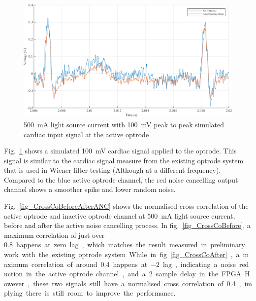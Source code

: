 \begin{landscape}\centering
\begin{figure}[h]
\centerline{\includegraphics[width=\linewidth]{5-Experiment/SimCardiac.pdf}}
\caption{\qty{500}{\mA} light source current with \qty{100}{\mV} peak to peak simulated cardiac input signal at the active optrode}
\label{fig_SimCardiac}
\end{figure}
\end{landscape}

Fig.~\ref{fig_SimCardiac} shows a simulated \qty{100}{mV} cardiac signal applied to the optrode.  This signal is similar to the cardiac signal measure from the existing optrode system that is used in Wiener filter testing (Although at a different frequency).  Compared to the blue active optrode channel, the red noise cancelling output channel shows a smoother spike and lower random noise.  

Fig.~\ref{fig_CrossCoBeforeAfterANC} shows the normalised cross correlation of the active optrode and inactive optrode channel at \qty{500}{mA} light source current, before and after the active noise cancelling process.  In fig.~\ref{fig_CrossCoBefore}, a maximum correlation of just over \qty{0.8} happens at zero lag, which matches the result measured in preliminary work with the existing optrode system.  While in fig.~\ref{fig_CrossCoAfter}, a maximum correlation of around \qty{0.4} happens at \qty{-2} lag, indicating a noise reduction in the active optrode channel, and a \qty{2} sample delay in the FPGA.  However, these two signals still have a normalised cross correlation of \qty{0.4}, implying there is still room to improve the performance. 


